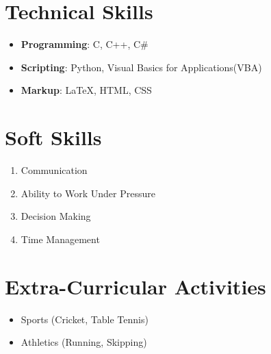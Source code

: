 \documentclass{article}
\begin{document}
\section{Technical Skills}
	\begin{itemize}
		\item \textbf{Programming}: C, C++, C\#
		\item \textbf{Scripting}: Python, Visual Basics for Applications(VBA)
		\item \textbf{Markup}: {\LaTeX}, HTML, CSS
	\end{itemize}

\section{Soft Skills}
	\begin{enumerate}
		\item Communication
		\item Ability to Work Under Pressure
		\item Decision Making
		\item Time Management
	\end{enumerate}

\section{Extra-Curricular Activities}
	\begin{itemize}
		\item Sports (Cricket, Table Tennis)
		\item Athletics (Running, Skipping)
	\end{itemize}
\end{document}
